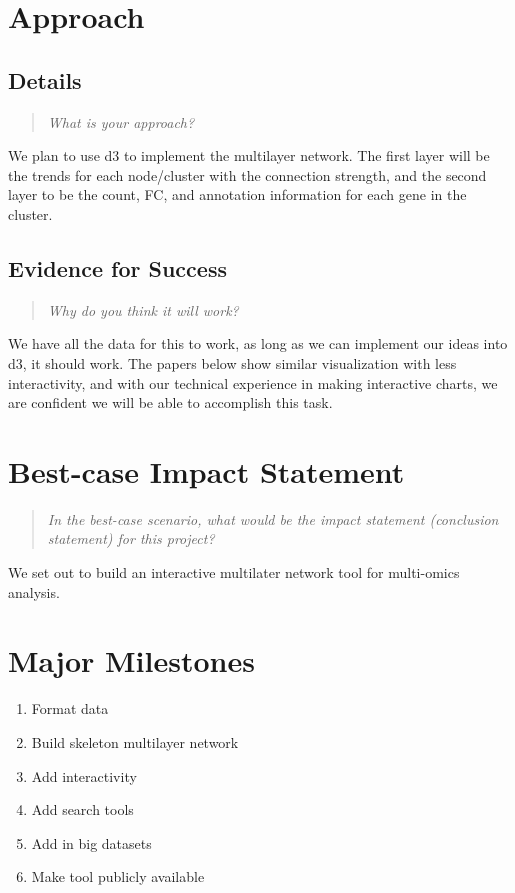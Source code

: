 \documentclass{proc}
\begin{document}
\section{Approach}
\subsection{Details}
\begin{quote}
\textit{What is your approach?}
\end{quote}

We plan to use d3 to implement the multilayer network. The first layer will be the trends for each node/cluster with the connection strength, and the second layer to be the count, FC, and annotation information for each gene in the cluster. 

\subsection{Evidence for Success}
\begin{quote}
\textit{Why do you think it will work?} 
\end{quote}

We have all the data for this to work, as long as we can implement our ideas into d3, it should work. The papers below show similar visualization with less interactivity, and with our technical experience in making interactive charts, we are confident we will be able to accomplish this task.

\section{Best-case Impact Statement}
\begin{quote}
\textit{In the best-case scenario, what would be the impact statement (conclusion statement) for this project?}
\end{quote}

We set out to build an interactive multilater network tool for multi-omics analysis.

\section{Major Milestones}

\begin{enumerate}
    \item Format data
    \item Build skeleton multilayer network
    \item Add interactivity
    \item Add search tools
    \item Add in big datasets
    \item Make tool publicly available
\end{enumerate}
\end{document}
